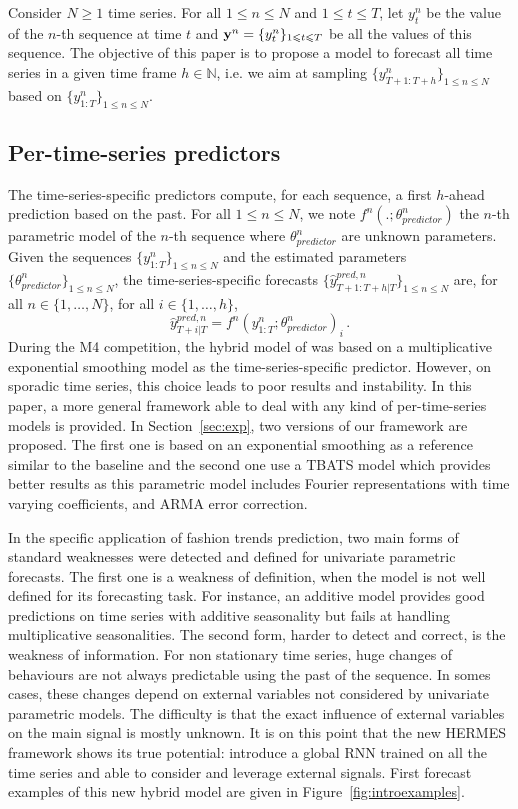 \documentclass[lettersize,journal]{IEEEtran}
\newcommand{\ts}{y}
\newcommand{\fullts}{{\bf \ts}}
\newcommand{\tspred}{\widehat{\ts}}
\newcommand{\stat}{f}
\newcommand{\statparam}{\theta_{predictor}}
\newcommand{\lag}{h}
\begin{document}
Consider $N\geqslant 1$ time series. For all $1\leqslant n \leqslant N$ and $1\leqslant t \leqslant T$, let $\ts_t^n$ be the value of the $n$-th sequence at time $t$ and  $\fullts^n = \{\ts_t^n\}_{1\leqslant t \leqslant T}$ be all the values of this sequence.   The objective of this paper is to propose a model to  forecast all time series in a given time frame  $\lag \in \mathbb{N}$, i.e. we aim at sampling $\{\ts^n_{T+1:T+\lag}\}_{1\leqslant n \leqslant N}$ based on $\{\ts^n_{1:T}\}_{1\leqslant n \leqslant N}$.


\subsection{Per-time-series predictors}
The time-series-specific predictors compute, for each sequence, a first $\lag$-ahead prediction based on the past. For all $1\leqslant n \leqslant N$, we note $\stat^n(.;\statparam^n)$ the $n$-th parametric model of the $n$-th sequence where $\statparam^n$ are  unknown parameters. Given the sequences $\{\ts^n_{1:T}\}_{1\leqslant n \leqslant N}$ and the estimated  parameters $\{\statparam^n\}_{1\leqslant n \leqslant N}$, the time-series-specific forecasts $\{\tspred^{pred,n}_{T+1:T+\lag|T}\}_{1\leqslant n \leqslant N}$ are, for all $n \in \{1,\ldots,N\}$, for all $i \in \{1,\ldots,\lag\}$,
$$
\tspred^{pred,n}_{T+i|T} = \stat^n(\ts^n_{1:T};\statparam^n)_i\,.
$$
During the M4 competition, the hybrid model of \cite{smyl2020hybrid} was based on a multiplicative exponential smoothing model as the time-series-specific predictor. However, on sporadic time series, this choice leads to poor results and instability. In this paper, a more general framework able to deal with any kind of per-time-series models is provided. In Section~\ref{sec:exp}, two versions of our framework are proposed. The first one is based on an  exponential smoothing as a reference similar to the baseline \cite{smyl2020hybrid} and the second one use a TBATS model \cite{doi:10.1198/jasa.2011.tm09771} which provides better results as this parametric model includes  Fourier representations with time varying coefficients, and ARMA error correction. 

In the specific application of fashion trends prediction, two main forms of standard weaknesses were detected and defined for univariate parametric forecasts. The first one is a weakness of definition, when the model is not well defined for its forecasting task. For instance, an additive model provides good predictions on time series with additive seasonality but fails at handling multiplicative seasonalities. The second form, harder to detect and correct, is the weakness of information. For non stationary time series, huge changes of behaviours are not always predictable using the past of the sequence. In somes cases, these changes depend on external variables not considered by univariate parametric models. The difficulty is that the exact influence of external variables on the main signal is mostly unknown. It is on this point that  the new HERMES framework shows its true potential: introduce a global RNN trained on all the time series and able to consider and leverage external signals. First forecast examples of this new hybrid model are given in Figure~\ref{fig:introexamples}.
\end{document}
